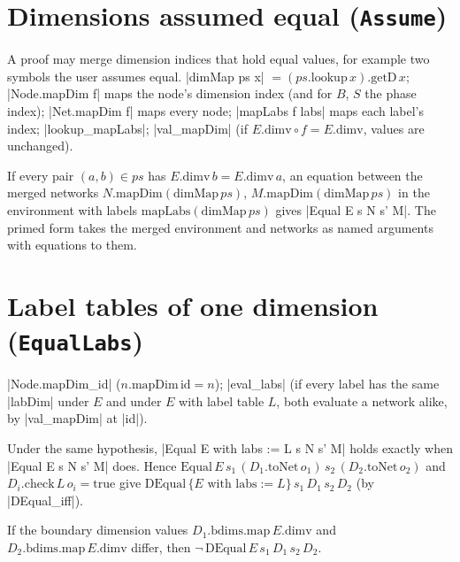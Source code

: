 \section{Dimensions assumed equal (\texttt{Assume})}\label{sec:lean-core-assume}

A proof may merge dimension indices that hold equal values, for example two symbols the user assumes
equal. \lean|dimMap ps x| $=(ps.\mathrm{lookup}\,x).\mathrm{getD}\,x$; \lean|Node.mapDim f| maps the node's
dimension index (and for $B$, $S$ the phase index); \lean|Net.mapDim f| maps every node;
\lean|mapLabs f labs| maps each label's index; \lean|lookup_mapLabs|; \lean|val_mapDim| (if
$E.\mathrm{dimv}\circ f=E.\mathrm{dimv}$, values are unchanged).

\begin{theorem}
If every pair $(a,b)\in ps$ has $E.\mathrm{dimv}\,b=E.\mathrm{dimv}\,a$, an equation between the merged networks
$N.\mathrm{mapDim}(\mathrm{dimMap}\,ps)$, $M.\mathrm{mapDim}(\mathrm{dimMap}\,ps)$ in the environment with labels
$\mathrm{mapLabs}(\mathrm{dimMap}\,ps)$ gives \lean|Equal E s N s' M|. The primed form takes the merged
environment and networks as named arguments with equations to them.
\end{theorem}

\section{Label tables of one dimension (\texttt{EqualLabs})}\label{sec:lean-core-equallabs}

\lean|Node.mapDim_id| ($n.\mathrm{mapDim}\,\mathrm{id}=n$); \lean|eval_labs| (if every label has the same
\lean|labDim| under $E$ and under $E$ with label table $L$, both evaluate a network alike, by
\lean|val_mapDim| at \lean|id|).

\begin{theorem}
Under the same hypothesis, \lean|Equal { E with labs := L } s N s' M| holds exactly when
\lean|Equal E s N s' M| does. Hence $\mathrm{Equal}\,E\,s_1\,(D_1.\mathrm{toNet}\,o_1)\,s_2\,(D_2.\mathrm{toNet}\,o_2)$ and
$D_i.\mathrm{check}\,L\,o_i=\mathrm{true}$ give $\mathrm{DEqual}\,\{E \text{ with labs} := L\}\,s_1\,D_1\,s_2\,D_2$ (by \lean|DEqual_iff|).
\end{theorem}

\begin{theorem}
If the boundary dimension values $D_1.\mathrm{bdims}.\mathrm{map}\,E.\mathrm{dimv}$ and
$D_2.\mathrm{bdims}.\mathrm{map}\,E.\mathrm{dimv}$ differ, then $\lnot\,\mathrm{DEqual}\,E\,s_1\,D_1\,s_2\,D_2$.
\end{theorem}

